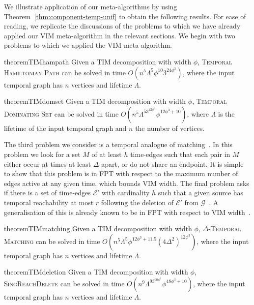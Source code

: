 \documentclass[a4paper,UKenglish,cleveref, autoref, thm-restate]{lipics-v2021} %
\begin{document}
We illustrate application of our meta-algorithms by using Theorem~\ref{thm:component-temp-unif} to obtain the following results. For ease of reading, we replicate the discussions of the problems to which we have already applied our VIM meta-algorithm in the relevant sections.
We begin with two problems to which we applied the VIM meta-algorithm.
\begin{restatable}{theorem}{TIMhampath}\label{thm:TIM-hampath}
    Given a TIM decomposition with width $\phi$,
    \textsc{Temporal Hamiltonian Path} can be solved in time $O(n^5\Lambda^5\phi^{10}3^{24\phi^3})$, where the input temporal graph has $n$ vertices and lifetime $\Lambda$.
\end{restatable}
\begin{restatable}{theorem}{TIMdomset}\label{thm:TIM-domset}
    Given a TIM decomposition with width $\phi$,
    \textsc{Temporal Dominating Set} can be solved in time $O(n^5\Lambda^53^{12\phi^3}\phi^{12\phi^3+10})$, where $\Lambda$ is the lifetime of the input temporal graph and $n$ the number of vertices.
\end{restatable}
The third problem we consider is a temporal analogue of matching~\cite{mertzios_computing_2023}. In this problem we look for a set $M$ of at least $h$ time-edges such that each pair in $M$ either occur at times at least $\Delta$ apart, or do not share an endpoint. It is simple to show that this problem is in FPT with respect to the maximum number of edges active at any given time, which bounds VIM width. The final problem asks if there is a set of time-edges $\mathcal{E}'$ with cardinality $h$ such that a given source has temporal reachability at most $r$ following the deletion of $\mathcal{E}'$ from $\mathcal{G}$~\cite{enright_deleting_2021}. A generalisation of this is already known to be in FPT with respect to VIM width~\cite{bumpus_edge_2023}.
\begin{restatable}{theorem}{TIMmatching}\label{thm:TIM-matching}
    Given a TIM decomposition with width $\phi$,
    \textsc{$\Delta$-Temporal Matching} can be solved in time $O(n^5\Lambda^5\phi^{12\phi^3+11.5}(4\Delta^2)^{12\phi^3})$, where the input temporal graph has $n$ vertices and lifetime $\Lambda$.
\end{restatable}

\begin{restatable}{theorem}{TIMdeletion}\label{thm:TIM-deletion}
    Given a TIM decomposition with width $\phi$,
    \textsc{SingReachDelete} can be solved in time $O(n^9\Lambda^93^{60\phi^3}\phi^{48\phi^3+10})$, where the input temporal graph has $n$ vertices and lifetime $\Lambda$.
\end{restatable}
\end{document}
